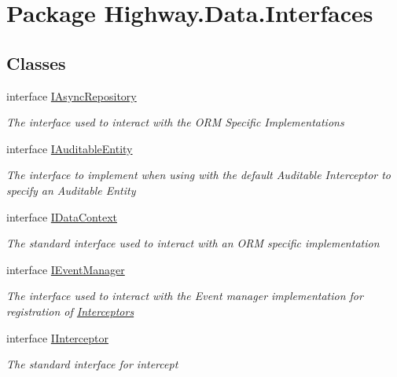 \hypertarget{namespace_highway_1_1_data_1_1_interfaces}{\section{Package Highway.\-Data.\-Interfaces}
\label{namespace_highway_1_1_data_1_1_interfaces}
}
\subsection*{Classes}
\begin{DoxyCompactItemize}
\item 
interface \hyperlink{interface_highway_1_1_data_1_1_interfaces_1_1_i_async_repository}{I\-Async\-Repository}
\begin{DoxyCompactList}\small\item\em The interface used to interact with the O\-R\-M Specific Implementations \end{DoxyCompactList}\item 
interface \hyperlink{interface_highway_1_1_data_1_1_interfaces_1_1_i_auditable_entity}{I\-Auditable\-Entity}
\begin{DoxyCompactList}\small\item\em The interface to implement when using with the default Auditable Interceptor to specify an Auditable Entity \end{DoxyCompactList}\item 
interface \hyperlink{interface_highway_1_1_data_1_1_interfaces_1_1_i_data_context}{I\-Data\-Context}
\begin{DoxyCompactList}\small\item\em The standard interface used to interact with an O\-R\-M specific implementation \end{DoxyCompactList}\item 
interface \hyperlink{interface_highway_1_1_data_1_1_interfaces_1_1_i_event_manager}{I\-Event\-Manager}
\begin{DoxyCompactList}\small\item\em The interface used to interact with the Event manager implementation for registration of \hyperlink{namespace_highway_1_1_data_1_1_interceptors}{Interceptors} \end{DoxyCompactList}\item 
interface \hyperlink{interface_highway_1_1_data_1_1_interfaces_1_1_i_interceptor-g}{I\-Interceptor}
\begin{DoxyCompactList}\small\item\em The standard interface for intercept \end{DoxyCompactList}\item 

\end{DoxyCompactItemize}
